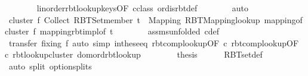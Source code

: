 \begin{isabellebody}
\ \ \ \ \ \ \isamarkupfalse%
\ linorder{\isachardot}{\kern0pt}rbt{\isacharunderscore}{\kern0pt}lookup{\isacharunderscore}{\kern0pt}keys{\isacharbrackleft}{\kern0pt}OF\ c{\isacharprime}{\kern0pt}{\isacharunderscore}{\kern0pt}class{\isacharbrackright}{\kern0pt}\ ord{\isachardot}{\kern0pt}is{\isacharunderscore}{\kern0pt}rbt{\isacharunderscore}{\kern0pt}def\isanewline
\ \ \ \ \ \ \isamarkupfalse%
\ auto\isanewline
\ \ \ \ \isamarkupfalse%
\ {\isachardoublequoteopen}cluster\ f\ {\isacharparenleft}{\kern0pt}Collect\ {\isacharparenleft}{\kern0pt}RBT{\isacharunderscore}{\kern0pt}Set{}{\isachardot}{\kern0pt}member\ t{\isacharparenright}{\kern0pt}{\isacharparenright}{\kern0pt}\ {\isacharequal}{\kern0pt}\ Mapping\ {\isacharparenleft}{\kern0pt}RBT{\isacharunderscore}{\kern0pt}Mapping{}{\isachardot}{\kern0pt}lookup\ {\isacharparenleft}{\kern0pt}mapping{\isacharunderscore}{\kern0pt}of{\isacharunderscore}{\kern0pt}cluster\ f\ {\isacharparenleft}{\kern0pt}mapping{\isacharunderscore}{\kern0pt}rbt{\isachardot}{\kern0pt}impl{\isacharunderscore}{\kern0pt}of\ t{\isacharparenright}{\kern0pt}{\isacharparenright}{\kern0pt}{\isacharparenright}{\kern0pt}{\isachardoublequoteclose}\isanewline
\ \ \ \ \ \ \isamarkupfalse%
\ assms{\isacharparenleft}{\kern0pt}{}{\isacharparenright}{\kern0pt}{\isacharbrackleft}{\kern0pt}unfolded\ c{\isacharprime}{\kern0pt}{\isacharunderscore}{\kern0pt}def{\isacharbrackright}{\kern0pt}\isanewline
\ \ \ \ \ \ \isamarkupfalse%
\ {\isacharparenleft}{\kern0pt}transfer\ fixing{\isacharcolon}{\kern0pt}\ f{\isacharparenright}{\kern0pt}\ {\isacharparenleft}{\kern0pt}auto\ simp{\isacharcolon}{\kern0pt}\ in{\isacharunderscore}{\kern0pt}these{\isacharunderscore}{\kern0pt}eq\ rbt{\isacharunderscore}{\kern0pt}comp{\isacharunderscore}{\kern0pt}lookup{\isacharbrackleft}{\kern0pt}OF\ c{\isacharbrackright}{\kern0pt}\ rbt{\isacharunderscore}{\kern0pt}comp{\isacharunderscore}{\kern0pt}lookup{\isacharbrackleft}{\kern0pt}OF\ c{\isacharprime}{\kern0pt}{\isacharbrackright}{\kern0pt}\ rbt{\isacharunderscore}{\kern0pt}lookup{\isacharunderscore}{\kern0pt}cluster\ dom{\isacharunderscore}{\kern0pt}ord{\isacharunderscore}{\kern0pt}rbt{\isacharunderscore}{\kern0pt}lookup{\isacharparenright}{\kern0pt}\isanewline
\ \ \isacommand{{\isacharbraceright}{\kern0pt}}\isamarkupfalse%
\isanewline
\ \ \isamarkupfalse%
\ \isamarkupfalse%
\ {\isacharquery}{\kern0pt}thesis\isanewline
\ \ \ \ \isamarkupfalse%
\ RBT{\isacharunderscore}{\kern0pt}set{\isacharunderscore}{\kern0pt}def\isanewline
\ \ \ \ \isamarkupfalse%
\ {\isacharparenleft}{\kern0pt}auto\ split{\isacharcolon}{\kern0pt}\ option{\isachardot}{\kern0pt}splits{\isacharparenright}{\kern0pt}\isanewline
{}\isamarkupfalse%
%
\endisatagproof
{\isafoldproof}%
%
\isadelimproof
\isanewline
%
\endisadelimproof
%
\isadelimtheory
\isanewline
%
\endisadelimtheory
%
\isatagtheory
{}\isamarkupfalse%
%
\endisatagtheory
{\isafoldtheory}%
%
\isadelimtheory
%
\endisadelimtheory
%
\end{isabellebody}%
